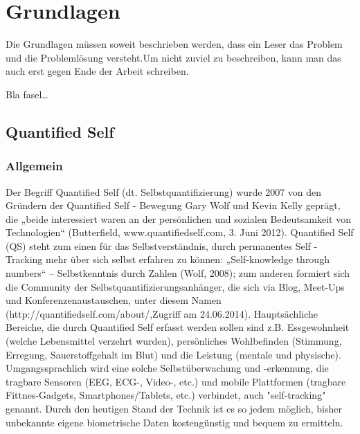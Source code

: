 
\chapter{Grundlagen}
\label{ch:Grundlagen}
Die Grundlagen müssen soweit beschrieben
werden, dass ein Leser das Problem und
die Problemlösung  versteht.Um nicht zuviel 
zu beschreiben, kann man das auch erst gegen 
Ende der Arbeit schreiben.

Bla fasel\ldots

\section{Quantified Self}
\label{ch:Grundlagen:sec:Quantified Self}

\subsection{Allgemein}
\label{ch:Grundlagen:sec:Quantified Self:subsec:Allg}

Der Begriff Quantified Self (dt. Selbstquantifizierung) wurde 2007 von den Gründern der Quantified Self - Bewegung Gary Wolf und Kevin Kelly geprägt, die „beide interessiert waren an der persönlichen und sozialen Bedeutsamkeit von Technologien“ (Butterfield, www.quantifiedself.com, 3. Juni 2012).
Quantified Self (QS) steht zum einen für das Selbstverständnis, durch permanentes Self - Tracking mehr über sich selbst erfahren zu können: 
„Self-knowledge through numbers“ – Selbstkenntnis durch Zahlen (Wolf, 2008); 
zum anderen formiert sich die Community der Selbstquantifizierungsanhänger, die sich via Blog, Meet-Ups und Konferenzenaustauschen, unter diesem Namen (http://quantifiedself.com/about/,Zugriff am 24.06.2014).
Hauptsächliche Bereiche, die durch Quantified Self erfasst werden sollen sind z.B. Essgewohnheit (welche Lebensmittel verzehrt wurden), persönliches Wohlbefinden (Stimmung, Erregung, Sauerstoffgehalt im Blut) und die Leistung (mentale und physische). 
Umgangssprachlich wird eine solche Selbstüberwachung und -erkennung, die tragbare Sensoren (EEG, ECG-, Video-, etc.) und mobile Plattformen (tragbare Fittnes-Gadgets, Smartphones/Tablets, etc.) verbindet, auch "self-tracking" genannt. 
Durch den heutigen Stand der Technik ist es so jedem möglich, bisher unbekannte eigene biometrische Daten kostengünstig und bequem zu ermitteln.

